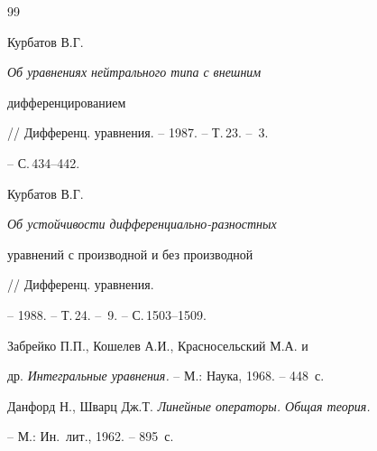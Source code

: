 \begin{thebibliography}{99}


Курбатов В.Г. {\em Об уравнениях нейтрального типа с внешним


дифференцированием} // Дифференц. уравнения. -- 1987. -- Т.\,23. -- \No\,3.


-- С.\,434--442.







Курбатов В.Г. {\em Об устойчивости дифференциально-разностных


уравнений с производной и без производной} // Дифференц. уравнения.


-- 1988. -- Т.\,24. -- \No\,9. -- С.\,1503--1509.







Забрейко П.П., Кошелев А.И., Красносельский М.А. и


др. {\em Интегральные уравнения.} -- М.: Наука, 1968. -- 448~с.







Данфорд Н., Шварц Дж.Т. {\em Линейные операторы. Общая теория.}


-- М.: Ин.~лит., 1962. -- 895~с.





\end{thebibliography} 


 


\vskip 2cm 









 


 


